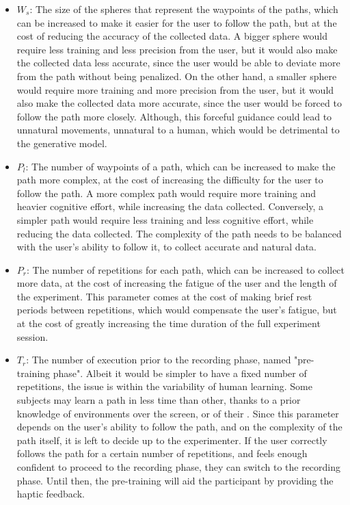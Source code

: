 \documentclass[12pt]{report}
\begin{document}
\begin{itemize}

    \item $W_s$: The size of the spheres that represent the waypoints of the paths, which can be increased to make it easier for the user to follow the path, but at the cost of reducing the accuracy of the collected data. A bigger sphere would require less training and less precision from the user, but it would also make the collected data less accurate, since the user would be able to deviate more from the path without being penalized. On the other hand, a smaller sphere would require more training and more precision from the user, but it would also make the collected data more accurate, since the user would be forced to follow the path more closely. Although, this forceful guidance could lead to unnatural movements, unnatural to a human, which would be detrimental to the generative model. 
    \item $P_l$: The number of waypoints of a path, which can be increased to make the path more complex, at the cost of increasing the difficulty for the user to follow the path. A more complex path would require more training and heavier cognitive effort, while increasing the data collected. Conversely, a simpler path would require less training and less cognitive effort, while reducing the data collected. The complexity of the path needs to be balanced with the user's ability to follow it, to collect accurate and natural data.
    \item $P_r$: The number of repetitions for each path, which can be increased to collect more data, at the cost of increasing the fatigue of the user and the length of the experiment. This parameter comes at the cost of making brief rest periods between repetitions, which would compensate the user's fatigue, but at the cost of greatly increasing the time duration of the full experiment session.
    \item $T_r$: The number of execution prior to the recording phase, named "pre-training phase". Albeit it would be simpler to have a fixed number of repetitions, the issue is within the variability of human learning. Some subjects may learn a path in less time than other, thanks to a prior knowledge of environments over the screen, or of their . Since this parameter depends on the user's ability to follow the path, and on the complexity of the path itself, it is left to decide up to the experimenter. If the user correctly follows the path for a certain number of repetitions, and feels enough confident to proceed to the recording phase, they can switch to the recording phase. Until then, the pre-training will aid the participant by providing the haptic feedback.
    


\end{itemize}
\end{document}
